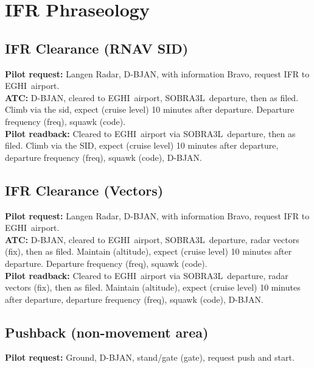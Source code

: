 \documentclass{article}
\newcommand{\control}{Langen Radar}
\newcommand{\callsign}{D-BJAN}
\newcommand{\destination}{EGHI}
\newcommand{\SID}{SOBRA3L}
\newcommand{\squawk}{(code)}
\begin{document}
\section{IFR Phraseology}

\subsection*{IFR Clearance (RNAV SID)}

\textbf{Pilot request:} \control, \callsign, with information Bravo, request IFR to \destination~airport. \\

\textbf{ATC:} \callsign, cleared to \destination~airport, \SID~departure, then as filed. Climb via the sid, expect (cruise level) 10 minutes after departure. Departure frequency (freq), squawk \squawk. \\

\textbf{Pilot readback:} Cleared to \destination~airport via \SID~departure, then as filed. Climb via the SID, expect (cruise level) 10 minutes after departure, departure frequency (freq), squawk \squawk, \callsign.

\subsection*{IFR Clearance (Vectors)}

\textbf{Pilot request:} \control, \callsign, with information Bravo, request IFR to \destination~airport. \\

\textbf{ATC:} \callsign, cleared to \destination~airport, \SID~departure, radar vectors (fix), then as filed. Maintain (altitude), expect (cruise level) 10 minutes after departure. Departure frequency (freq), squawk \squawk. \\

\textbf{Pilot readback:} Cleared to \destination~airport via \SID~departure, radar vectors (fix), then as filed. Maintain (altitude), expect (cruise level) 10 minutes after departure, departure frequency (freq), squawk \squawk, \callsign.

\subsection*{Pushback (non-movement area)}

\textbf{Pilot request:} Ground, \callsign, stand/gate (gate), request push and start. \\
\end{document}
